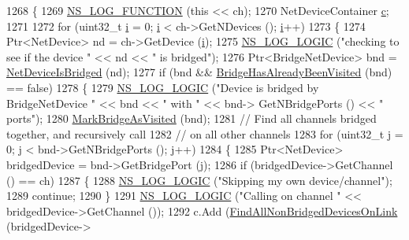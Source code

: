 \begin{DoxyCode}
1268 \{
1269   \hyperlink{log-macros-disabled_8h_a90b90d5bad1f39cb1b64923ea94c0761}{NS\_LOG\_FUNCTION} (\textcolor{keyword}{this} << ch);
1270   NetDeviceContainer \hyperlink{lte_2model_2fading-traces_2fading__trace__generator_8m_ae0323a9039add2978bf5b49550572c7c}{c};
1271 
1272   \textcolor{keywordflow}{for} (uint32\_t \hyperlink{bernuolliDistribution_8m_a6f6ccfcf58b31cb6412107d9d5281426}{i} = 0; \hyperlink{bernuolliDistribution_8m_a6f6ccfcf58b31cb6412107d9d5281426}{i} < ch->GetNDevices (); \hyperlink{bernuolliDistribution_8m_a6f6ccfcf58b31cb6412107d9d5281426}{i}++)
1273     \{
1274       Ptr<NetDevice> nd = ch->GetDevice (\hyperlink{bernuolliDistribution_8m_a6f6ccfcf58b31cb6412107d9d5281426}{i});
1275       \hyperlink{group__logging_ga88acd260151caf2db9c0fc84997f45ce}{NS\_LOG\_LOGIC} (\textcolor{stringliteral}{"checking to see if the device "} << nd << \textcolor{stringliteral}{" is bridged"});
1276       Ptr<BridgeNetDevice> bnd = \hyperlink{classns3_1_1GlobalRouter_ad330b65439cd1be39799b52df948f98b}{NetDeviceIsBridged} (nd);
1277       \textcolor{keywordflow}{if} (bnd && \hyperlink{classns3_1_1GlobalRouter_ab358e6c36f04f05c42a4ca2c472c3179}{BridgeHasAlreadyBeenVisited} (bnd) == \textcolor{keyword}{false})
1278         \{
1279           \hyperlink{group__logging_ga88acd260151caf2db9c0fc84997f45ce}{NS\_LOG\_LOGIC} (\textcolor{stringliteral}{"Device is bridged by BridgeNetDevice "} << bnd << \textcolor{stringliteral}{" with "} << bnd->
      GetNBridgePorts () << \textcolor{stringliteral}{" ports"});
1280           \hyperlink{classns3_1_1GlobalRouter_a27297efb3e69712604932d5275ab2abb}{MarkBridgeAsVisited} (bnd);
1281           \textcolor{comment}{// Find all channels bridged together, and recursively call}
1282           \textcolor{comment}{// on all other channels}
1283           \textcolor{keywordflow}{for} (uint32\_t j = 0; j < bnd->GetNBridgePorts (); j++)
1284             \{
1285               Ptr<NetDevice> bridgedDevice = bnd->GetBridgePort (j);
1286               \textcolor{keywordflow}{if} (bridgedDevice->GetChannel () == ch)
1287                 \{
1288                   \hyperlink{group__logging_ga88acd260151caf2db9c0fc84997f45ce}{NS\_LOG\_LOGIC} (\textcolor{stringliteral}{"Skipping my own device/channel"});
1289                   \textcolor{keywordflow}{continue};
1290                 \}
1291               \hyperlink{group__logging_ga88acd260151caf2db9c0fc84997f45ce}{NS\_LOG\_LOGIC} (\textcolor{stringliteral}{"Calling on channel "} << bridgedDevice->GetChannel ());
1292               c.Add (\hyperlink{classns3_1_1GlobalRouter_af1fc3edcc4d14d9344f3b94617da8e85}{FindAllNonBridgedDevicesOnLink} (bridgedDevice->

\end{DoxyCode}
